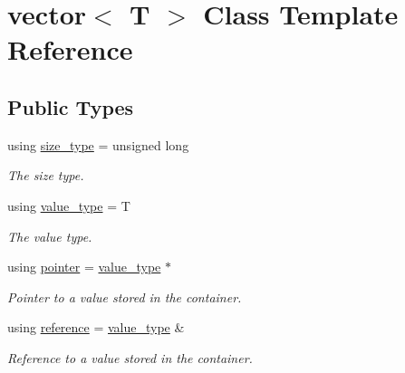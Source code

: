 \hypertarget{classvector}{}\section{vector$<$ T $>$ Class Template Reference}
\label{classvector}
\subsection*{Public Types}
\begin{DoxyCompactItemize}
\item 
\mbox{\label{classvector_a4d06f3ade0c2ac023b7a7edb85d9d1ef}} 
using \hyperlink{classvector_a4d06f3ade0c2ac023b7a7edb85d9d1ef}{size\+\_\+type} = unsigned long
\begin{DoxyCompactList}\small\item\em The size type. \end{DoxyCompactList}\item 
\mbox{\label{classvector_a734f2f7bdca203914356632292c0c596}} 
using \hyperlink{classvector_a734f2f7bdca203914356632292c0c596}{value\+\_\+type} = T
\begin{DoxyCompactList}\small\item\em The value type. \end{DoxyCompactList}\item 
\mbox{\label{classvector_a6826d03fa03dbe9e6e21328770c2f308}} 
using \hyperlink{classvector_a6826d03fa03dbe9e6e21328770c2f308}{pointer} = \hyperlink{classvector_a734f2f7bdca203914356632292c0c596}{value\+\_\+type} $\ast$
\begin{DoxyCompactList}\small\item\em Pointer to a value stored in the container. \end{DoxyCompactList}\item 
\mbox{\label{classvector_a068ad546247a09ea9dd025658ad69348}} 
using \hyperlink{classvector_a068ad546247a09ea9dd025658ad69348}{reference} = \hyperlink{classvector_a734f2f7bdca203914356632292c0c596}{value\+\_\+type} \&
\begin{DoxyCompactList}\small\item\em Reference to a value stored in the container. \end{DoxyCompactList}\item 

\end{DoxyCompactItemize}
